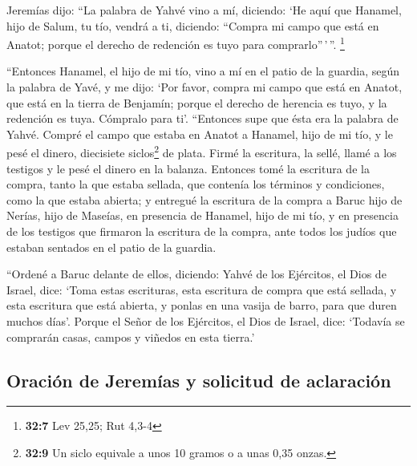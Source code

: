 \begin{paracol}{2}
 Jeremías dijo: ``La palabra de Yahvé vino a mí, diciendo:
 `He aquí que Hanamel, hijo de Salum, tu tío, vendrá a ti,
diciendo: ``Compra mi campo que está en Anatot; porque el derecho de
redención es tuyo para comprarlo''\,'\,''. \footnote{\textbf{32:7} Lev
  25,25; Rut 4,3-4}

 ``Entonces Hanamel, el hijo de mi tío, vino a mí en el
patio de la guardia, según la palabra de Yavé, y me dijo: `Por favor,
compra mi campo que está en Anatot, que está en la tierra de Benjamín;
porque el derecho de herencia es tuyo, y la redención es tuya. Cómpralo
para ti'. ``Entonces supe que ésta era la palabra de Yahvé.
 Compré el campo que estaba en Anatot a Hanamel, hijo de
mi tío, y le pesé el dinero, diecisiete siclos\footnote{\textbf{32:9} Un
  siclo equivale a unos 10 gramos o a unas 0,35 onzas.} de plata.
 Firmé la escritura, la sellé, llamé a los testigos y le
pesé el dinero en la balanza.  Entonces tomé la escritura
de la compra, tanto la que estaba sellada, que contenía los términos y
condiciones, como la que estaba abierta;  y entregué la
escritura de la compra a Baruc hijo de Nerías, hijo de Maseías, en
presencia de Hanamel, hijo de mi tío, y en presencia de los testigos que
firmaron la escritura de la compra, ante todos los judíos que estaban
sentados en el patio de la guardia.

 ``Ordené a Baruc delante de ellos, diciendo:
 Yahvé de los Ejércitos, el Dios de Israel, dice: `Toma
estas escrituras, esta escritura de compra que está sellada, y esta
escritura que está abierta, y ponlas en una vasija de barro, para que
duren muchos días'.  Porque el Señor de los Ejércitos, el
Dios de Israel, dice: `Todavía se comprarán casas, campos y viñedos en
esta tierra.'

\hypertarget{oraciuxf3n-de-jeremuxedas-y-solicitud-de-aclaraciuxf3n}{%
\subsection{Oración de Jeremías y solicitud de
aclaración}\label{oraciuxf3n-de-jeremuxedas-y-solicitud-de-aclaraciuxf3n}}


\end{paracol}
